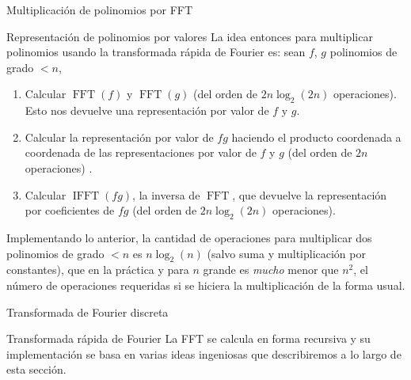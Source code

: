 \begin{chapter}{Multiplicación de polinomios por FFT}
\begin{section}{Representación de polinomios por valores}
        La idea entonces para multiplicar polinomios usando la transformada rápida de Fourier es:  sean $f$, $g$ polinomios de grado $<n$,
        \begin{enumerate}
            \item Calcular $\operatorname{FFT}(f)$ y $\operatorname{FFT}(g)$ (del orden de $2n\operatorname{log}_2(2n)$ operaciones). Esto nos devuelve una representación por valor de $f$ y $g$.
            \item Calcular  la representación por valor de $fg$ haciendo el producto coordenada a coordenada de las representaciones por valor de $f$ y $g$ (del orden de $2n$ operaciones)  .
            \item Calcular $\operatorname{IFFT}(fg)$, la inversa de $\operatorname{FFT}$, que devuelve la representación por coeficientes de $fg$ (del orden de $2n\operatorname{log}_2(2n)$ operaciones).
        \end{enumerate}

        Implementando lo anterior, la cantidad de operaciones para multiplicar dos polinomios de grado $<n$  es $n \log_2(n)$ (salvo suma y multiplicación por constantes), que en la práctica y para $n$ grande es \textit{mucho} menor que $n^2$, el número de operaciones requeridas si se hiciera la multiplicación de la forma usual. 

    \end{section}

    \begin{section}{Transformada de Fourier discreta} 
        
    \end{section}

        \begin{section}{Transformada rápida de Fourier} La FFT se calcula en forma recursiva y su implementación se basa en varias ideas ingeniosas que describiremos a lo largo de esta sección. 


\end{section}
\end{chapter}
